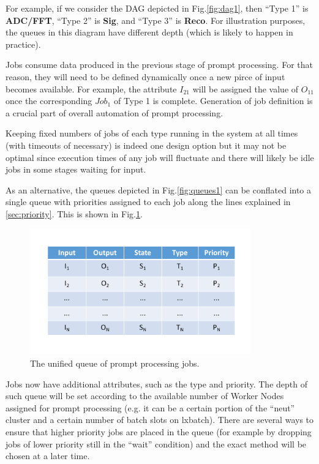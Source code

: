 \documentclass[pdftex,12pt,letter]{article}
\begin{document}
For example, if we consider the DAG depicted in Fig.\ref{fig:dag1}, then ``Type 1''
is \textbf{ADC/FFT}, ``Type 2'' is \textbf{Sig}, and ``Type 3'' is \textbf{Reco}. For illustration purposes,
the queues in this diagram have different depth (which is likely to happen in practice).

Jobs consume data produced in the previous stage of prompt processing. For that reason, they
will need to be defined dynamically once a new pirce of input becomes available. For example,
the attribute $I_{21}$ will be assigned the value of $O_{11}$ once the corresponding $Job_1$ of Type 1
is complete. Generation of job definition is a crucial part of overall automation of prompt processing.

Keeping fixed numbers of jobs of each type running in the system at all times (with timeouts of necessary)
is indeed one design option but it may not be optimal since execution times of any job will fluctuate and there
will likely be idle jobs in some stages waiting for input.

As an alternative, the queues depicted in Fig.\ref{fig:queues1} can be conflated into a single queue
with priorities assigned to each job along the lines explained in \ref{sec:priority}. This is shown in
Fig.\ref{fig:queues2}.
\begin{figure}[tbh]
  \centering
  \includegraphics[width=0.85\textwidth]{figures/prompt_queues_2.pdf}
  \caption{The unified queue of prompt processing jobs.}
  \label{fig:queues2}
\end{figure}
Jobs now have additional attributes, such as the type and priority.
The depth of such queue will be set according to the available number of Worker Nodes assigned for
prompt processing (e.g. it can be a certain portion of the ``neut'' cluster and a certain number of batch slots on
lxbatch). There are several ways to ensure that higher priority jobs are placed in the queue (for example by
dropping jobs of lower priority still in the ``wait'' condition) and the exact method will be chosen at a later time.
\end{document}
